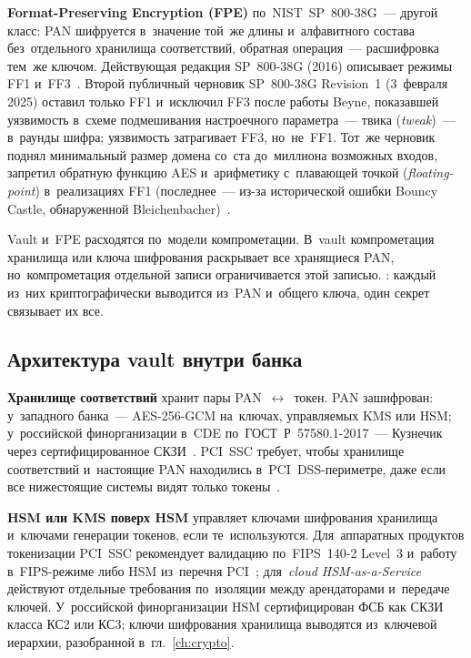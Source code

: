 \textbf{Format-Preserving Encryption (FPE)} по~NIST~SP~800-38G~--- другой
класс: PAN шифруется в~значение той~же длины и~алфавитного состава
без~отдельного хранилища соответствий, обратная операция~--- расшифровка тем~же
ключом. Действующая редакция SP~800-38G (2016) описывает режимы FF1
и~FF3~\cite{nist-sp-800-38g}. Второй публичный черновик SP~800-38G Revision~1
(3~февраля 2025) оставил только FF1 и~исключил FF3 после работы Beyne, показавшей уязвимость в~схеме подмешивания
настроечного параметра~--- твика (\textit{tweak})~--- в~раунды шифра;
уязвимость затрагивает FF3, но~не~FF1. Тот~же черновик поднял минимальный размер домена
со~ста до~миллиона возможных входов, запретил обратную функцию AES
и~арифметику с~плавающей точкой (\textit{floating-point}) в~реализациях FF1
(последнее~--- из-за исторической ошибки Bouncy Castle, обнаруженной
Bleichenbacher)~\cite{nist-sp-800-38g-r1}.

Vault и~FPE расходятся по~модели компрометации. В~vault компрометация хранилища
или ключа шифрования раскрывает все хранящиеся PAN, но~компрометация отдельной
записи ограничивается этой записью. : каждый
из~них криптографически выводится из~PAN и~общего ключа, один секрет связывает
их все.

\subsection*{Архитектура vault внутри банка}

\textbf{Хранилище соответствий} хранит пары PAN~$\leftrightarrow$~токен. PAN
зашифрован: у~западного банка~--- AES-256-GCM на~ключах, управляемых KMS или
HSM; у~российской финорганизации в~CDE по~ГОСТ~Р~57580.1-2017~--- Кузнечик через
сертифицированное СКЗИ~\cite{gost-57580-1}. PCI~SSC требует, чтобы
хранилище соответствий и~настоящие PAN находились в~PCI~DSS-периметре, даже
если все нижестоящие системы видят только
токены~\cite{pci-tokenization-guidelines}.

\textbf{HSM или KMS поверх HSM} управляет ключами шифрования хранилища
и~ключами генерации токенов, если те~используются. Для~аппаратных продуктов токенизации PCI~SSC
рекомендует валидацию по~FIPS~140-2 Level~3 и~работу в~FIPS-режиме либо HSM
из~перечня PCI~\cite{pci-token-product-security-2015};
для~\textit{cloud HSM-as-a-Service} действуют отдельные требования по~изоляции
между арендаторами и~передаче ключей. У~российской финорганизации HSM
сертифицирован ФСБ как СКЗИ класса КС2 или КС3; ключи шифрования хранилища
выводятся из~ключевой иерархии, разобранной в~гл.~\ref{ch:crypto}.

